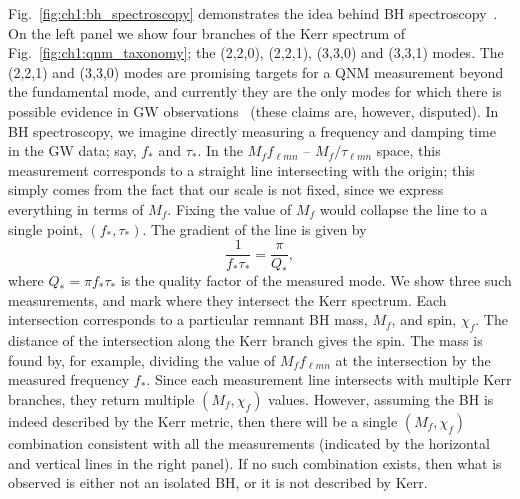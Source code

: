 Fig.~\ref{fig:ch1:bh_spectroscopy} demonstrates the idea behind BH spectroscopy~\cite{Dreyer:2003bv}.
On the left panel we show four branches of the Kerr spectrum of Fig.~\ref{fig:ch1:qnm_taxonomy}; the (2,2,0), (2,2,1), (3,3,0) and (3,3,1) modes.
The (2,2,1) and (3,3,0) modes are promising targets for a QNM measurement beyond the fundamental mode, and currently they are the only modes for which there is possible evidence in GW observations~\cite{Isi:2019aib, Capano:2021etf} (these claims are, however, disputed).
In BH spectroscopy, we imagine directly measuring a frequency and damping time in the GW data; say, $f_*$ and $\tau_*$.
In the $M_f f_{\ell m n}$ -- $M_f/\tau_{\ell m n}$ space, this measurement corresponds to a straight line intersecting with the origin; this simply comes from the fact that our scale is not fixed, since we express everything in terms of $M_f$. 
Fixing the value of $M_f$ would collapse the line to a single point, $(f_*,\tau_*)$.
The gradient of the line is given by
\begin{equation}
    \frac{1}{f_* \tau_*} = \frac{\pi}{Q_*},
\end{equation}
where $Q_* = \pi f_* \tau_*$ is the quality factor of the measured mode.
We show three such measurements, and mark where they intersect the Kerr spectrum.
Each intersection corresponds to a particular remnant BH mass, $M_f$, and spin, $\chi_f$. 
The distance of the intersection along the Kerr branch gives the spin.
The mass is found by, for example, dividing the value of $M_f f_{\ell m n}$ at the intersection by the measured frequency $f_*$.
Since each measurement line intersects with multiple Kerr branches, they return multiple $(M_f, \chi_f)$ values. 
However, assuming the BH is indeed described by the Kerr metric, then there will be a single $(M_f,\chi_f)$ combination consistent with all the measurements (indicated by the horizontal and vertical lines in the right panel).
If no such combination exists, then what is observed is either not an isolated BH, or it is not described by Kerr.
